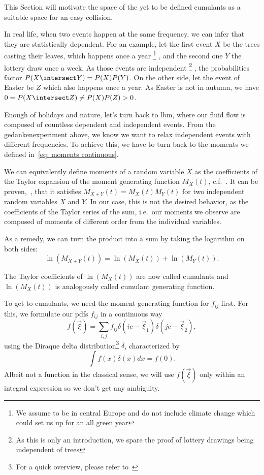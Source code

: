 
This Section will motivate the space of the yet to be defined cumulants as a suitable space for an easy collision.

In real life, when two events happen at the same frequency, we can infer that they are statistically dependent.
For an example, let the first event $X$ be the trees casting their leaves, which happens once a year
\footnote{We assume to be in central Europe and do not include climate change which could set us up for an all green year}
, and the second one $Y$ the lottery draw once a week.
As those events are independent
\footnote{As this is only an introduction, we spare the proof of lottery drawings being independent of trees}
, the probabilities factor $P(X\intersect Y) = P(X)P(Y)$.
On the other side, let the event of Easter be $Z$ which also happens once a year. As Easter is not in autumn, we have $0 = P(X\intersect Z) \neq P(X)P(Z) > 0$.

Enough of holidays and nature, let's turn back to \gls{lbm}, where our fluid flow is composed of countless dependent and independent events.
From the gedankenexperiment above, we know we want to relax independent events with different frequencies.
To achieve this, we have to turn back to the moments we defined in~\eqref{eq: moments continuous}.

We can equivalently define moments of a random variable $X$ as the coefficients of the Taylor expansion of the moment generating function $M_X(t)$, c.f.~\cite{weissteinMGF}.
It can be proven,~\cite{weissteinMGF}, that it satisfies $M_{X+Y}(t) = M_{X}(t)M_{Y}(t)$ for two independent random variables $X$ and $Y$.
In our case, this is not the desired behavior, as the coefficients of the Taylor series of the sum, i.e.\ our moments we observe are composed of moments of different order from the individual variables.

As a remedy, we can turn the product into a sum by taking the logarithm on both sides:
\begin{equation}
  \ln(M_{X+Y}(t)) = \ln(M_{X}(t)) + \ln(M_{Y}(t)).
\end{equation}

The Taylor coefficients of $\ln(M_X(t))$ are now called cumulants and $\ln(M_{X}(t))$ is analogously called cumulant generating function.

To get to cumulants, we need the moment generating function for $f_{ij}$ first.
For this, we formulate our \glspl{pdf} $f_{ij}$ in a continuous way
\begin{equation}
  \label{eq:Definition of f xi}
  f(\vec{\xi}) = \sum_{i,j} f_{ij}\delta(ic - \vec{\xi}_1)\delta(jc - \vec{\xi}_2),
\end{equation}
using the Diraque delta distribution\footnote{For a quick overview, please refer to~\cite{weissteinDelta}} $\delta$, characterized by
\begin{equation}
  \int f(x)\delta(x)dx = f(0).
\end{equation}
Albeit not a function in the classical sense, we will use $f(\vec{\xi})$ only within an integral expression so we don't get any ambiguity.



